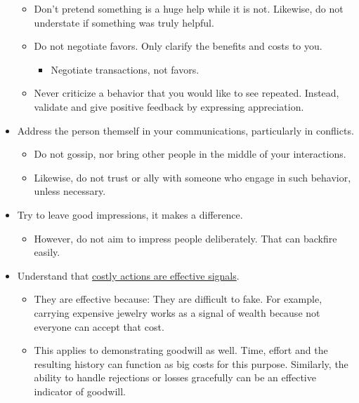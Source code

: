 \documentclass[
]{book}
\providecommand{\tightlist}{%
  \setlength{\itemsep}{0pt}\setlength{\parskip}{0pt}}
\begin{document}
\begin{itemize}
  \begin{itemize}
  \tightlist
  \item
    Don't pretend something is a huge help while it is not. Likewise, do not understate if something was truly helpful.
  \item
    Do not negotiate favors. Only clarify the benefits and costs to you.

    \begin{itemize}
    \tightlist
    \item
      Negotiate transactions, not favors.
    \end{itemize}
  \item
    Never criticize a behavior that you would like to see repeated. Instead, validate and give positive feedback by expressing appreciation.\\
  \end{itemize}
\item
  Address the person themself in your communications, particularly in conflicts.

  \begin{itemize}
  \tightlist
  \item
    Do not gossip, nor bring other people in the middle of your interactions.
  \item
    Likewise, do not trust or ally with someone who engage in such behavior, unless necessary.
  \end{itemize}
\item
  Try to leave good impressions, it makes a difference.

  \begin{itemize}
  \tightlist
  \item
    However, do not aim to impress people deliberately. That can backfire easily.
  \end{itemize}
\item
  Understand that \href{https://en.wikipedia.org/wiki/Costly_signaling_theory_in_evolutionary_psychology}{costly actions are effective signals}.

  \begin{itemize}
  \tightlist
  \item
    They are effective because: They are difficult to fake. For example, carrying expensive jewelry works as a signal of wealth because not everyone can accept that cost.
  \item
    This applies to demonstrating goodwill as well. Time, effort and the resulting history can function as big costs for this purpose. Similarly, the ability to handle rejections or losses gracefully can be an effective indicator of goodwill.
  \end{itemize}
\end{itemize}
\end{document}
